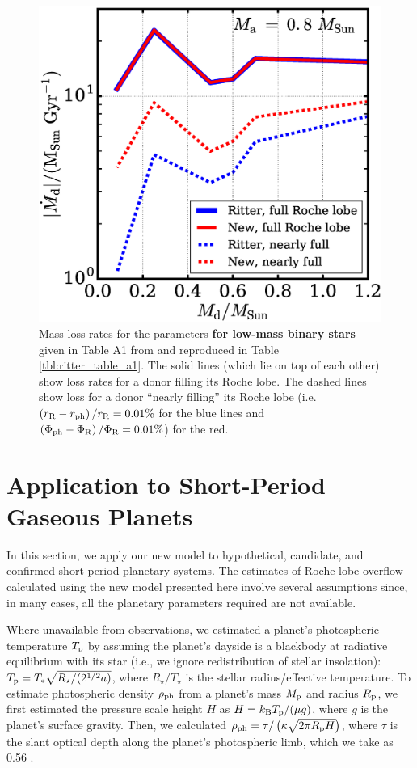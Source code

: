 \documentclass{aastex}
\begin{document}
\begin{figure}
\includegraphics[width=\textwidth]{compare_mdot}
\caption{Mass loss rates for the parameters {\bf for low-mass binary stars} given in Table A1 from \citet{1988A&A...202...93R} and reproduced in Table \ref{tbl:ritter_table_a1}. The solid lines (which lie on top of each other) show loss rates for a donor filling its Roche lobe. The dashed lines show loss for a donor ``nearly filling'' its Roche lobe (i.e. $\left( r_{\rm R} - r_{\rm ph} \right)/r_{\rm R} = 0.01\%$ for the blue lines and $\left( \Phi_{\rm ph} - \Phi_{\rm R} \right)/\Phi_{\rm R} = 0.01\%$) for the red.}
\label{fig:compare_mdot}
\end{figure}

\section{Application to Short-Period Gaseous Planets}
\label{sec:results}

In this section, we apply our new model to hypothetical, candidate, and confirmed short-period planetary systems. The estimates of Roche-lobe overflow calculated using the new model presented here involve several assumptions since, in many cases, all the planetary parameters required are not available.

Where unavailable from observations, we estimated a planet's photospheric temperature $T_{\rm p}$ by assuming the planet's dayside is a blackbody at radiative equilibrium with its star (i.e., we ignore redistribution of stellar insolation): $T_{\rm p} = T_* \sqrt{R_\star/(2^{1/2} a)}$, where $R_\star/T_\star$ is the stellar radius/effective temperature. To estimate photospheric density $\rho_{\rm ph}$ from a planet's mass $M_{\rm p}$ and radius $R_{\rm p}$, we first estimated the pressure scale height $H$ as $H = k_{\rm B} T_{\rm p}/(\mu g)$, where $g$ is the planet's surface gravity. Then, we calculated $\rho_{\rm ph} = \tau/\left( \kappa \sqrt{2 \pi R_{\rm p} H} \right)$, where $\tau$ is the slant optical depth along the planet's photospheric limb, which we take as 0.56 \citep[][Appendix]{2012ApJ...756..176H}. 
\end{document}

